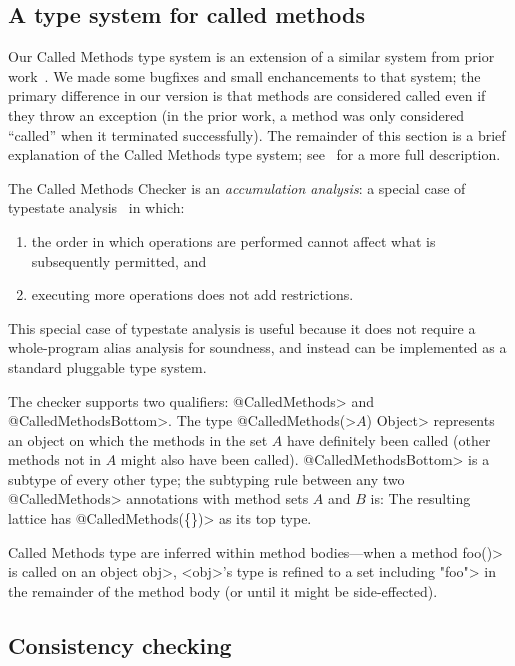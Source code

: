 \subsection{A type system for called methods}
\label{sec:called-methods}

Our Called Methods type system is an extension of a similar system
from prior work~\cite{kellogg20verifying}. We made some bugfixes and
small enchancements to that system; the primary difference in our
version is that methods are considered called even if they throw an exception
(in the prior work, a method was only considered ``called'' when it terminated
successfully). The remainder of this section is a brief explanation
of the Called Methods type system; see~\cite{kellogg20verifying} for
a more full description.

The Called Methods Checker is an \emph{accumulation analysis}: a special case
of typestate analysis~\cite{StromY86} in which:
\begin{enumerate}
\item the order in which operations are performed cannot affect what is
  subsequently permitted, and
\item executing more operations does not add restrictions.
\end{enumerate}
This special case of typestate analysis is useful because it does not
require a whole-program alias analysis for soundness, and instead
can be implemented as a standard pluggable type system.

The checker supports two qualifiers: \<@CalledMethods>
and \<@CalledMethodsBottom>. The type \<@CalledMethods(>$A$\<) Object>
represents an object on which the methods in the set $A$ have definitely
been called (other methods not in $A$ might also have been called).
\<@CalledMethodsBottom> is a subtype of every other type; the subtyping
rule between any two \<@CalledMethods> annotations with method sets $A$
and $B$ is:
The resulting lattice has \<@CalledMethods(\{\})> as its top type.

Called Methods type are inferred within method bodies---when a method
\<foo()> is called on an object \<obj>, <obj>'s type is refined to a
set including \<"foo"> in the remainder of the method body (or until
it might be side-effected).

\subsection{Consistency checking}
\label{sec:must-call-invoked}

